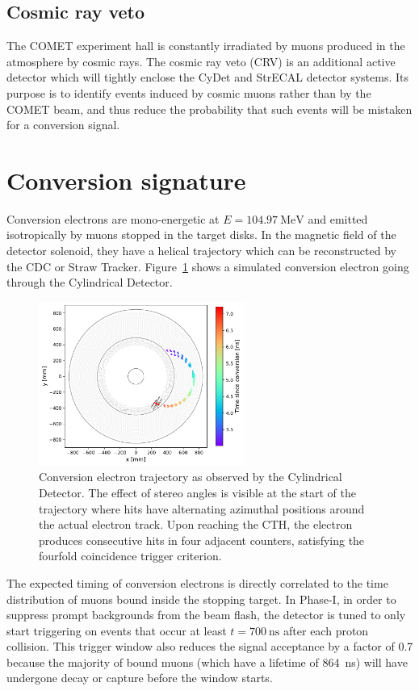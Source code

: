 \subsection{Cosmic ray veto}
The COMET experiment hall is constantly irradiated by muons produced in the
atmosphere by cosmic rays. The cosmic ray veto (CRV) is an additional active
detector which will tightly enclose the CyDet and StrECAL detector systems. Its
purpose is to identify events induced by cosmic muons rather than by the COMET
beam, and thus reduce the probability that such events will be mistaken for a
conversion signal.

\section{Conversion signature}
Conversion electrons are mono-energetic at $E=\SI{104.97}{\MeV}$ and emitted
isotropically by muons stopped in the target disks. In the magnetic field of the
detector solenoid, they have a helical trajectory which can be reconstructed by
the CDC or Straw Tracker. Figure~\ref{fig:cydet_signal_event} shows a simulated
conversion electron going through the Cylindrical Detector.



\begin{figure}
    \centering
    \includegraphics[width=0.6\textwidth]{chapter2/cydet_signal_track_v3.pdf}
    \caption{ Conversion electron trajectory as observed by the Cylindrical
    Detector. The effect of stereo angles is visible at the start of the
    trajectory where hits have alternating azimuthal positions around the actual
    electron track. Upon reaching the CTH, the electron produces consecutive
    hits in four adjacent counters, satisfying the fourfold coincidence trigger
    criterion.}
    \label{fig:cydet_signal_event}
\end{figure}


The expected timing of conversion electrons is directly correlated to the time
distribution of muons bound inside the stopping target. In Phase-I, in order to
suppress prompt backgrounds from the beam flash, the detector is tuned to only
start triggering on events that occur at least $t=\SI{700}{\ns}$ after each
proton collision. This trigger window also reduces the signal acceptance by
a factor of 0.7 because the majority of bound muons (which have a lifetime of
\SI{864}{\ns}) will have undergone decay or capture before the window starts.

